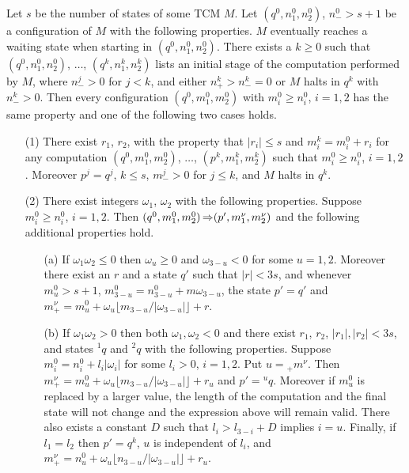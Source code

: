 \documentclass[12pt]{article}
\begin{document}
\begin{lemma}\label{fstg}
Let $s$ be the number of states of some TCM $M$. Let $(q^0, n^0_1,
n^0_2)$, $n^0_->s+1$ be a configuration of $M$ with the following
properties. $M$ eventually reaches a waiting state when starting in $(q^0, n^0_1,
n^0_2)$. There exists a $k\geq0$ such that
$(q^0, n^0_1, n^0_2)$, $\ldots$, $(q^k, n^k_1, n^k_2)$ lists an initial stage of the computation
performed by $M$, where $n^j_->0$ for $j<k$, and
either $n^k_+>n^k_-=0$ or $M$ halts in $q^k$ with $n^k_->0$. Then every configuration $(q^0, m^0_1,
m^0_2)$ with $m^0_i\geq n^0_i$, $i=1,2$ has the same property and one of
the following two cases holds.
\begin{itemize}
\item[{\rm(1)}] There exist $r_1$, $r_2$, with the property that $|r_i|\leq s$ and
  $m_i^k=m_i^0+r_i$ for any computation $(q^0, m^0_1, m^0_2)$,
  $\ldots$, $(p^k, m^k_1, m^k_2)$ such that $m^0_i\geq n^0_i$,
  $i=1,2$. Moreover $p^j=q^j$, $k\leq s$, $m^j_->0$ for $j\leq k$,
  and $M$ halts in $q^k$.

\item[{\rm(2)}] There exist integers $\omega_1$, $\omega_2$
  with the following properties. Suppose $m^0_i\geq n^0_i$, $i=1,2$. Then 
  $(q^0, m^0_1, m^0_2)\mathop{\Rightarrow}\limits^{}(p',m^\nu_1,m^\nu_2)$ and 
  the following additional properties hold.
\begin{itemize}
\item[{\rm(a)}] If $\omega_1\omega_2\leq0$ then $\omega_u\geq0$ and
  $\omega_{3-u}<0$ for some $u=1,2$. Moreover there exist an $r$ and a state $q'$ such that
  $|r|<3s$, and whenever $m^0_u>s+1$, $m^0_{3-u}=n^0_{3-u}+m\omega_{3-u}$, the state
  $p'=q'$ and $m^\nu_+=m^0_u+\omega_u\lfloor m_{3-u}/|\omega_{3-u}|\rfloor+r$.

\item[{\rm(b)}] 
  If $\omega_1\omega_2>0$ then both $\omega_1,\omega_2<0$ and
  there exist $r_1$, $r_2$, $|r_1|,|r_2|<3s$, and states ${}^1q$ and ${}^2q$ 
  with the following properties. Suppose $m^0_i=n^0_i+l_i|\omega_i|$ for
  some $l_i>0$, $i=1,2$. Put $u={}_+m^\nu$. Then
  $m^\nu_+=m^0_u+\omega_u\lfloor m_{3-u}/|\omega_{3-u}|\rfloor+r_u$ and $p'={}^uq$.
  Moreover if $m^0_u$ is replaced by a larger value, the length of the
  computation and the final state will not change and the expression above will remain
  valid. There also exists a constant $D$ such that $l_i>l_{3-i}+D$
  implies $i=u$. Finally, if $l_1=l_2$ then $p'=q^k$, $u$ is
  independent of $l_i$, and $m^\nu_+=n^0_u+\omega_u\lfloor n_{3-u}/|\omega_{3-u}|\rfloor+r_u$.

\end{itemize}
\end{itemize}
\end{lemma}
\end{document}
